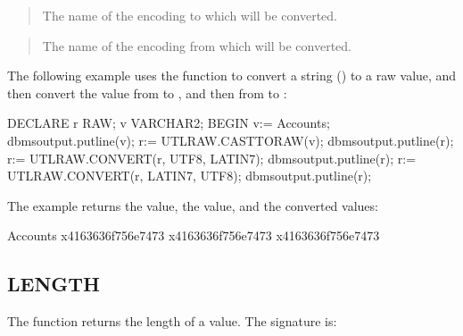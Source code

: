 \documentclass[letterpaper,10pt,english,openany,oneside]{sphinxmanual}
\begin{document}
\begin{quote}

The name of the encoding to which  will be converted.
\end{quote}

\begin{quote}

The name of the encoding from which  will be converted.
\end{quote}


The following example uses the  function to
convert a  string () to a raw value, and then convert
the value from  to , and then from  to :

%
\begin{sphinxVerbatim}[commandchars=\\\{\}]
DECLARE
  r RAW;
  v VARCHAR2;
BEGIN
  v:= \PYGZsq{}Accounts\PYGZsq{};
  dbms\PYGZus{}output.put\PYGZus{}line(v);
  r:= UTL\PYGZus{}RAW.CAST\PYGZus{}TO\PYGZus{}RAW(v);
  dbms\PYGZus{}output.put\PYGZus{}line(r);
  r:= UTL\PYGZus{}RAW.CONVERT(r, \PYGZsq{}UTF8\PYGZsq{}, \PYGZsq{}LATIN7\PYGZsq{});
  dbms\PYGZus{}output.put\PYGZus{}line(r);
  r:= UTL\PYGZus{}RAW.CONVERT(r, \PYGZsq{}LATIN7\PYGZsq{}, \PYGZsq{}UTF8\PYGZsq{});
  dbms\PYGZus{}output.put\PYGZus{}line(r);
\end{sphinxVerbatim}

The example returns the  value, the  value, and the converted values:

%
\begin{sphinxVerbatim}[commandchars=\\\{\}]
Accounts
\PYGZbs{}x4163636f756e7473
\PYGZbs{}x4163636f756e7473
\PYGZbs{}x4163636f756e7473
\end{sphinxVerbatim}

\newpage


\subsection{LENGTH}
\label{\detokenize{utl_raw:length}}
The  function returns the length of a  value. The signature is:
\begin{quote}

\end{quote}
\end{document}
